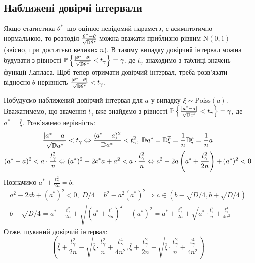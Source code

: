 \subsection{Наближені довірчі інтервали}
Якщо статистика $\theta^*$, що оцінює невідомий параметр, є асимптотично нормальною, то розподіл 
$\frac{\theta^* - \theta}{\sqrt{\mathbb{D}\theta^*}}$ можна вважати приблизно рівним $\mathrm{N}(0, 1)$ (звісно, при достатньо великих $n$).
В такому випадку довірчий інтервал можна будувати з рівності
$\mathbb{P}\left\{\frac{|\theta^* - \theta|}{\sqrt{\mathbb{D}\theta^*}} < t_{\gamma}\right\} = \gamma$, де $t_{\gamma}$
знаходимо з таблиці значень функції Лапласа. Щоб тепер отримати довірчий інтервал, треба розв'язати відносно
$\theta$ нерівність $\frac{|\theta^* - \theta|}{\sqrt{\mathbb{D}\theta^*}} < t_{\gamma}$.
\begin{example}
    Побудуємо наближений довірчий інтервал для $a$ у випадку $\xi \sim \mathrm{Poiss}(a)$. Вважатимемо, що значення $t_\gamma$
    вже знайдемо з рівності 
    $\mathbb{P}\left\{\frac{|a^* - a|}{\sqrt{\mathbb{D} a^*}} < t_{\gamma}\right\} = \gamma$, де $a^* = \overline{\xi}$. Розв'яжемо нерівність:
    \begin{gather*}
        \frac{|a^* - a|}{\sqrt{\mathbb{D} a^*}} < t_{\gamma} \Leftrightarrow
        \frac{(a^* - a)^2}{\mathbb{D} a^*} < t_{\gamma}^2, \; \mathbb{D} a^* = \mathbb{D} \overline{\xi} = \frac{1}{n}\mathbb{D}\xi = \frac{1}{n}{a} \\
        (a^* - a)^2 < a \cdot \frac{t_{\gamma}^2}{n} \Leftrightarrow (a^*)^2 - 2a^* a + a^2 < a \cdot \frac{t_{\gamma}^2}{n}
        \Leftrightarrow a^2 - 2a \left( a^* + \frac{t_{\gamma}^2}{2n}\right) + (a^*)^2 < 0
    \end{gather*}
    Позначимо $a^* + \frac{t_{\gamma}^2}{2n} = b$:
    \begin{gather*}
        a^2 - 2ab + (a^*)^2 < 0, \; D/4 = b^2 - a^2 (a^*)^2 \Rightarrow
        a \in \left(b - \sqrt{D/4}, b + \sqrt{D/4} \right) \\
        b \pm \sqrt{D/4} =  a^* + \frac{t_{\gamma}^2}{2n} \pm 
        \sqrt{\left( a^* + \frac{t_{\gamma}^2}{2n}\right)^2  - (a^*)^2} = 
        a^* + \frac{t_{\gamma}^2}{2n} \pm 
        \sqrt{a^* \cdot\frac{t_{\gamma}^2}{n} + \frac{t_{\gamma}^4}{4n^2}}
    \end{gather*}
    Отже, шуканий довірчий інтервал:
    $$ 
    \left(\overline{\xi} + \frac{t_{\gamma}^2}{2n} -
    \sqrt{\overline{\xi} \cdot\frac{t_{\gamma}^2}{n} + \frac{t_{\gamma}^4}{4n^2}},
    \overline{\xi} + \frac{t_{\gamma}^2}{2n} +
    \sqrt{\overline{\xi} \cdot\frac{t_{\gamma}^2}{n} + \frac{t_{\gamma}^4}{4n^2}}
    \right)
    $$
\end{example}

